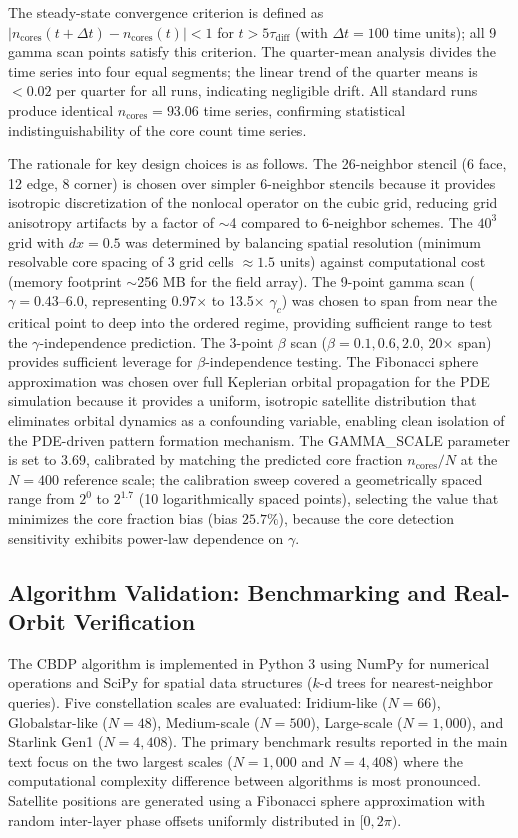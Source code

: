 \documentclass[sn-nature,pdflatex]{sn-jnl}
\begin{document}
The steady-state convergence criterion is defined as $|n_{\text{cores}}(t + \Delta t) - n_{\text{cores}}(t)| < 1$ for $t > 5\tau_{\text{diff}}$ (with $\Delta t = 100$ time units); all 9 gamma scan points satisfy this criterion. The quarter-mean analysis divides the time series into four equal segments; the linear trend of the quarter means is $<0.02$ per quarter for all runs, indicating negligible drift. All standard runs produce identical $n_{\text{cores}} = 93.06$ time series, confirming statistical indistinguishability of the core count time series.

The rationale for key design choices is as follows. The 26-neighbor stencil (6 face, 12 edge, 8 corner) is chosen over simpler 6-neighbor stencils because it provides isotropic discretization of the nonlocal operator on the cubic grid, reducing grid anisotropy artifacts by a factor of $\sim$4 compared to 6-neighbor schemes. The $40^3$ grid with $dx=0.5$ was determined by balancing spatial resolution (minimum resolvable core spacing of 3 grid cells $\approx 1.5$ units) against computational cost (memory footprint $\sim$256 MB for the field array). The 9-point gamma scan ($\gamma = 0.43$--$6.0$, representing 0.97$\times$ to 13.5$\times$ $\gamma_c$) was chosen to span from near the critical point to deep into the ordered regime, providing sufficient range to test the $\gamma$-independence prediction. The 3-point $\beta$ scan ($\beta=0.1, 0.6, 2.0$, 20$\times$ span) provides sufficient leverage for $\beta$-independence testing. The Fibonacci sphere approximation was chosen over full Keplerian orbital propagation for the PDE simulation because it provides a uniform, isotropic satellite distribution that eliminates orbital dynamics as a confounding variable, enabling clean isolation of the PDE-driven pattern formation mechanism. The GAMMA\_SCALE parameter is set to 3.69, calibrated by matching the predicted core fraction $n_{\text{cores}}/N$ at the $N=400$ reference scale; the calibration sweep covered a geometrically spaced range from $2^0$ to $2^{1.7}$ (10 logarithmically spaced points), selecting the value that minimizes the core fraction bias (bias $25.7\%$), because the core detection sensitivity exhibits power-law dependence on $\gamma$.

\subsection{Algorithm Validation: Benchmarking and Real-Orbit Verification}

The CBDP algorithm is implemented in Python 3 using NumPy for numerical operations and SciPy for spatial data structures ($k$-d trees for nearest-neighbor queries). Five constellation scales are evaluated: Iridium-like ($N = 66$), Globalstar-like ($N = 48$), Medium-scale ($N = 500$), Large-scale ($N = 1,000$), and Starlink Gen1 ($N = 4,408$). The primary benchmark results reported in the main text focus on the two largest scales ($N=1,000$ and $N=4,408$) where the computational complexity difference between algorithms is most pronounced. Satellite positions are generated using a Fibonacci sphere approximation with random inter-layer phase offsets uniformly distributed in $[0, 2\pi)$.
\end{document}
